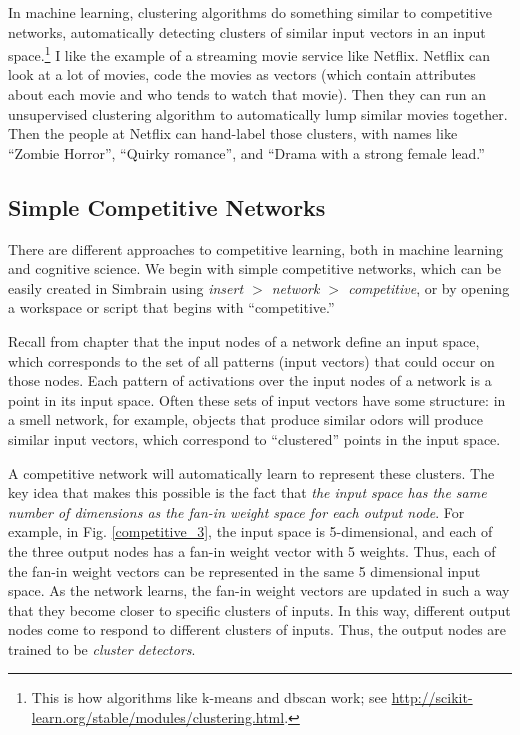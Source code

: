 In machine learning, clustering algorithms do something similar to competitive networks, automatically detecting clusters of similar input vectors in an input space.\footnote{This is how algorithms like k-means and dbscan work; see \url{http://scikit-learn.org/stable/modules/clustering.html}.} I like the example of a streaming movie service like Netflix. Netflix can look at  a lot of movies, code the movies as vectors (which contain attributes about each movie and who tends to watch that movie). Then they can run an unsupervised clustering algorithm to automatically lump similar movies together. Then the people at Netflix can hand-label those clusters, with names like ``Zombie Horror'', ``Quirky romance'', and ``Drama with a strong female lead.''

\subsection{Simple Competitive Networks}

There are different approaches to competitive learning, both in machine learning and cognitive science. We begin with simple competitive networks, which can be easily created in Simbrain using \emph{insert $>$ network $>$ competitive}, or by opening a workspace or script that begins with ``competitive.''

Recall from chapter  that the input nodes of a network define an input space, which corresponds to the set of all patterns (input vectors) that could occur on those nodes. Each pattern of activations over the input nodes of a network is a point in its input space. Often these sets of input vectors have some structure: in a smell network, for example, objects that produce similar odors will produce similar input vectors, which correspond to ``clustered'' points in the input space. 

A competitive network will automatically learn to represent these clusters. The key idea that makes this possible is the fact that {\it the input space has the same number of dimensions as the fan-in weight space for each output node}. For example, in Fig. \ref{competitive_3}, the input space is 5-dimensional, and each of the three output nodes has a fan-in weight vector with 5 weights. Thus, each of the fan-in weight vectors can be represented in the same 5 dimensional input space. As the network learns, the fan-in weight vectors are updated in such a way that they become closer to specific clusters of inputs. In this way, different output nodes come to respond to different clusters of inputs. Thus, the output nodes are trained to be \emph{cluster detectors}.


